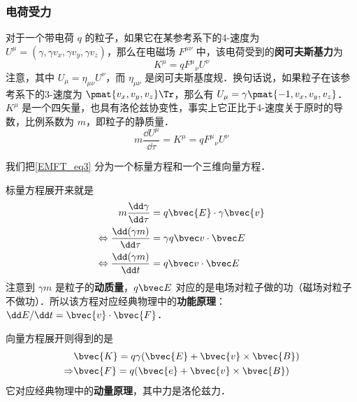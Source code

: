 \subsubsection{电荷受力}

对于一个带电荷 $q$ 的粒子，如果它在某参考系下的4-速度为 $U^\mu=(\gamma,\gamma v_x,\gamma v_y,\gamma v_z)$，那么在电磁场 $F^{\mu\nu}$ 中，该电荷受到的\textbf{闵可夫斯基力}为
\begin{equation}
K^{\mu}=q {F^{\mu}}_\nu U^\nu
\end{equation}
注意，其中 $U_\mu=\eta_{\mu\nu}U^\nu$，而 $\eta_{\mu\nu}$ 是闵可夫斯基度规．换句话说，如果粒子在该参考系下的3-速度为 $\pmat{v_x, v_y, v_z}\Tr$，那么有 $U_\mu=\gamma\pmat{-1, v_x, v_y, v_z}$．$K^\mu$ 是一个四矢量，也具有洛伦兹协变性，事实上它正比于4-速度关于原时的导数，比例系数为 $m$，即粒子的静质量．
\begin{equation}\label{EMFT_eq3}
m\frac{\dd U^\mu}{\dd \tau}=K^\mu=q {F^{\mu}}_\nu U^\nu
\end{equation}

我们把\autoref{EMFT_eq3} 分为一个标量方程和一个三维向量方程．

标量方程展开来就是
\begin{equation}
\begin{aligned}
m\frac{\dd \gamma}{\dd\tau}&=q \bvec{E}\cdot \gamma\bvec{v}\\
\Leftrightarrow\frac{\dd (\gamma m)}{\dd \tau}&=\gamma q \bvec v\cdot \bvec E\\
\Leftrightarrow \frac{\dd (\gamma m)}{\dd t}&=q\bvec v\cdot \bvec E
\end{aligned}
\end{equation}
注意到 $\gamma m$ 是粒子的\textbf{动质量}，$q \bvec E$ 对应的是电场对粒子做的功（磁场对粒子不做功）．所以该方程对应经典物理中的\textbf{功能原理}：$\dd E/\dd t=\bvec{v}\cdot\bvec{F}$．

向量方程展开则得到的是
\begin{equation}
\begin{aligned}
&\bvec{K}=q\gamma(\bvec{E}+\bvec{v}\times\bvec{B})\\
\Rightarrow &\bvec{F}=q(\bvec{e}+\bvec{v}\times\bvec{B})
\end{aligned}
\end{equation}
它对应经典物理中的\textbf{动量原理}，其中力是洛伦兹力．






